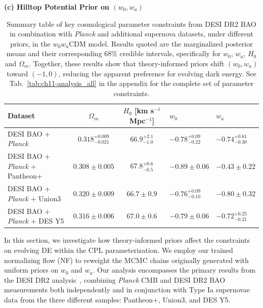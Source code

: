 \begin{table}[!t]
	\textbf{(c) Hilltop Potential Prior on $(w_0,w_a)$}\\[6pt]
		\begingroup
		\renewcommand{\arraystretch}{1}
		\begin{tabularx}{\textwidth}{@{}>{\raggedright\arraybackslash}p{3.5cm} c c W W @{}}
			\toprule
			Dataset & $\Omega_m$ & $H_0$ [km s$^{-1}$ Mpc$^{-1}$] & $w_0$ & $w_a$ \\
			\midrule[0.065em]
			DESI BAO + {\it Planck}  & $0.318^{+0.009}_{-0.021}$ & $66.9^{+2.1}_{-1.0}$ & $-0.78^{+0.09}_{-0.22}$ & $-0.74^{+0.61}_{-0.30}$ \\
			DESI BAO + {\it Planck}  + Pantheon+ & $0.308\pm 0.005$ & $67.8^{+0.6}_{-0.5}$ & $-0.89\pm 0.06$ & $-0.43\pm 0.22$\\
			DESI BAO + {\it Planck}  + Union3 & $0.320\pm 0.009$ & $66.7\pm 0.9$ & $-0.76^{+0.09}_{-0.10}$ & $-0.80\pm 0.32$ \\
			DESI BAO + {\it Planck}  + DES Y5 & $0.316\pm 0.006$ & $67.0\pm 0.6$ & $-0.79\pm 0.06$ & $-0.72^{+0.25}_{-0.21}$\\
			\bottomrule
		\end{tabularx}
		\endgroup
	\caption[Cosmological parameter constraints under uniform and theory-informed priors]{Summary table of key cosmological parameter constraints from DESI DR2 BAO in combination with {\it Planck} and additional supernova datasets, under different priors, in the $w_0 w_a$CDM model. Results quoted are the marginalized posterior means and their corresponding 68\% credible intervals, specifically for $w_0$, $w_a$, $H_0$ and $\Omega_m$. Together, these results show that theory-informed priors shift $(w_0,w_a)$ toward $(-1,0)$, reducing the apparent preference for evolving dark energy. See Tab.~\ref{tab:ch11-analysis_all} in the appendix for the complete set of parameter constraints.}
	\label{tab:ch11-table_post}
\end{table}

\noindent In this section, we investigate how theory-informed priors affect the constraints on evolving DE within the CPL parameterization. We employ our trained normalizing flow (NF) to reweight the MCMC chains originally generated with uniform priors on $w_0$ and $w_a$. Our analysis encompasses the primary results from the DESI DR2 analysis~\cite{DESI:2025zgx, DESI:2025fii}, combining \textit{Planck} CMB and DESI DR2 BAO measurements both independently and in conjunction with Type Ia supernovae data from the three different samples: Pantheon+, Union3, and DES Y5.


